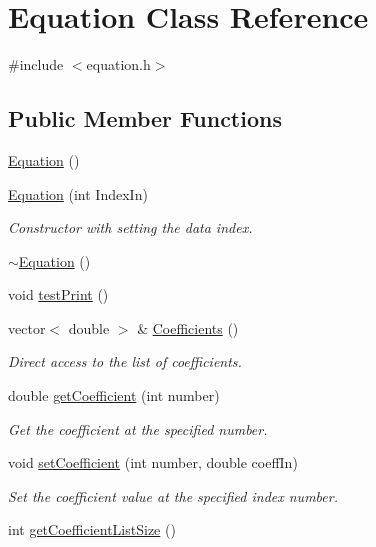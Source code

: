 \hypertarget{class_equation}{\section{Equation Class Reference}
\label{class_equation}
}


{\ttfamily \#include $<$equation.\-h$>$}

\subsection*{Public Member Functions}
\begin{DoxyCompactItemize}
\item 
\hyperlink{class_equation_a68511fc719250ed80f86c50de9136733}{Equation} ()
\item 
\hyperlink{class_equation_a37fec641aec75302c37590d191421790}{Equation} (int Index\-In)
\begin{DoxyCompactList}\small\item\em Constructor with setting the data index. \end{DoxyCompactList}\item 
\hyperlink{class_equation_a097243d0dfd608330fc91f115a0d15bb}{$\sim$\-Equation} ()
\item 
void \hyperlink{class_equation_af6c9148998a4abe47f4a4215c51ce3c8}{test\-Print} ()
\item 
vector$<$ double $>$ \& \hyperlink{class_equation_abe2b02e37a07bddaf1040d2d24c3564c}{Coefficients} ()
\begin{DoxyCompactList}\small\item\em Direct access to the list of coefficients. \end{DoxyCompactList}\item 
double \hyperlink{class_equation_a6aa77458d50e80de2a31708756c7925b}{get\-Coefficient} (int number)
\begin{DoxyCompactList}\small\item\em Get the coefficient at the specified number. \end{DoxyCompactList}\item 
void \hyperlink{class_equation_a96dd6f24624703a1ff3ffb4d19a76582}{set\-Coefficient} (int number, double coeff\-In)
\begin{DoxyCompactList}\small\item\em Set the coefficient value at the specified index number. \end{DoxyCompactList}\item 
int \hyperlink{class_equation_abb01745ac8c816354d72ee529d2bddc0}{get\-Coefficient\-List\-Size} ()

\end{DoxyCompactItemize}
